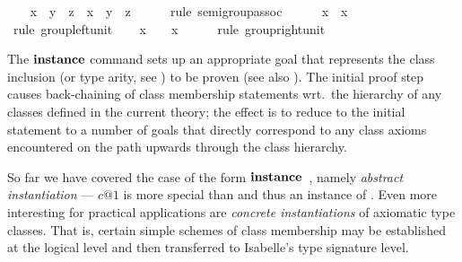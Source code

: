 \begin{isabellebody}
\ \ \isamarkupfalse%
\ {\isachardoublequoteopen}x\ {\isasymodot}\ y\ {\isasymodot}\ z\ {\isacharequal}\ x\ {\isasymodot}\ {\isacharparenleft}y\ {\isasymodot}\ z{\isacharparenright}{\isachardoublequoteclose}\isanewline
\ \ \ \ \isamarkupfalse%
\ {\isacharparenleft}rule\ semigroup{\isachardot}assoc{\isacharparenright}\isanewline
\ \ \isamarkupfalse%
\ {\isachardoublequoteopen}{\isasymone}\ {\isasymodot}\ x\ {\isacharequal}\ x{\isachardoublequoteclose}\isanewline
\ \ \ \ \isamarkupfalse%
\ {\isacharparenleft}rule\ group{\isachardot}left{\isacharunderscore}unit{\isacharparenright}\isanewline
\ \ \isamarkupfalse%
\ {\isachardoublequoteopen}x\ {\isasymodot}\ {\isasymone}\ {\isacharequal}\ x{\isachardoublequoteclose}\isanewline
\ \ \ \ \isamarkupfalse%
\ {\isacharparenleft}rule\ group{\isacharunderscore}right{\isacharunderscore}unit{\isacharparenright}\isanewline
{}\isamarkupfalse%
%
\endisatagproof
{\isafoldproof}%
%
\isadelimproof
%
\endisadelimproof
%
\begin{isamarkuptext}%
\medskip The ${\mathord{\mathbf{instance}}}$ command sets up an appropriate goal that
  represents the class inclusion (or type arity, see
  ) to be proven (see also
  \cite{isabelle-isar-ref}).  The initial proof step causes
  back-chaining of class membership statements wrt.\ the hierarchy of
  any classes defined in the current theory; the effect is to reduce
  to the initial statement to a number of goals that directly
  correspond to any class axioms encountered on the path upwards
  through the class hierarchy.%
\end{isamarkuptext}%
\isamarkuptrue%
%
\isamarkuptrue%
%
\begin{isamarkuptext}%
So far we have covered the case of the form ${\mathord{\mathbf{instance}}}$~, namely \emph{abstract instantiation} ---
  $c@1$ is more special than  and thus an instance
  of .  Even more interesting for practical
  applications are \emph{concrete instantiations} of axiomatic type
  classes.  That is, certain simple schemes  of class membership may be established at the
  logical level and then transferred to Isabelle's type signature
  level.


\end{isamarkuptext}
\end{isabellebody}
